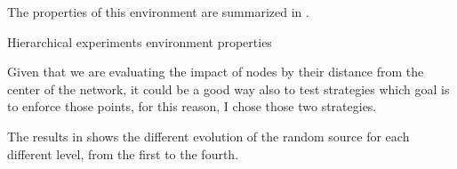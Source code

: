 The properties of this environment are summarized in .

\begin{table}[h]
	
	\caption{Hierarchical experiments environment properties}
	\label{tbl:hierarchical_properties}
\end{table}

Given that we are evaluating the impact of nodes by their distance from 
the center of the network, it could be a good way also to test strategies
which goal is to enforce those points, for this reason, I chose those two
strategies.

The results in  shows the different evolution of
the random source for each different level, from the first to the fourth.

